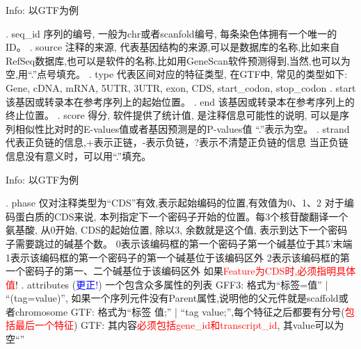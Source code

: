 \begin{frame}{Info: 以GTF为例}
    \begin{myoutline}
        . seq\_id
            \2 序列的编号, 一般为chr或者scanfold编号, 每条染色体拥有一个唯一的ID。
        . source
            \2 注释的来源, 代表基因结构的来源,可以是数据库的名称,比如来自RefSeq数据库,也可以是软件的名称,比如用GeneScan软件预测得到,当然,也可以为空,用``.''点号填充。
        . type
            \2 代表区间对应的特征类型, 在GTF中, 常见的类型如下:
                \3 Gene, cDNA, mRNA, 5UTR, 3UTR, exon, CDS, start\_codon, stop\_codon
        . start
            \2 该基因或转录本在参考序列上的起始位置。
        . end
            \2 该基因或转录本在参考序列上的终止位置。
        . score
            \2 得分, 软件提供了统计值, 是注释信息可能性的说明, 可以是序列相似性比对时的E-values值或者基因预测是的P-values值
            \2 ``.''表示为空。
        . strand
            \2 代表正负链的信息,+表示正链，-表示负链，?表示不清楚正负链的信息
            \2 当正负链信息没有意义时，可以用``.''填充。
    \end{myoutline}
\end{frame}
\begin{frame}{Info: 以GTF为例}
    \begin{myoutline}
        . phase
            \2 仅对注释类型为``CDS''有效,表示起始编码的位置,有效值为0、1、2
                \3 对于编码蛋白质的CDS来说, 本列指定下一个密码子开始的位置。每3个核苷酸翻译一个氨基酸, 从0开始, CDS的起始位置, 除以3, 余数就是这个值, 表示到达下一个密码子需要跳过的碱基个数。
                \3 0表示该编码框的第一个密码子第一个碱基位于其5'末端
                \3 1表示该编码框的第一个密码子的第一个碱基位于该编码区外
                \3 2表示该编码框的第一个密码子的第一、二个碱基位于该编码区外
            \2 如果\textcolor{red}{Feature为CDS时,必须指明具体值}!
        . attributes (\textcolor{blue}{更正!})
            \2 一个包含众多属性的列表
                \3 GFF3: 格式为``标签=值'' | ``(tag=value)'', 如果一个序列元件没有Parent属性,说明他的父元件就是scaffold或者chromosome
                \3 GTF: 格式为``标签 值;'' | ``tag value;'',每个特征之后都要有分号(\textcolor{red}{包括最后一个特征})
                \3 GTF: 其内容\textcolor{red}{必须包括gene\_id和transcript\_id}, 其value可以为空``''
    \end{myoutline}
\end{frame}




